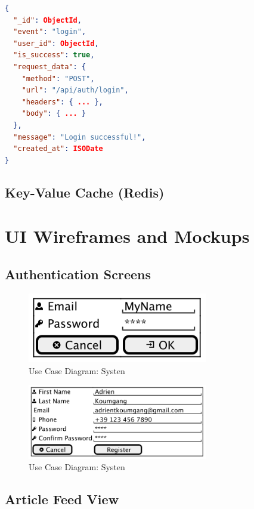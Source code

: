 \begin{lstlisting}[language=json]
{
  "_id": ObjectId,
  "event": "login",
  "user_id": ObjectId,
  "is_success": true,
  "request_data": {
    "method": "POST",
    "url": "/api/auth/login",
    "headers": { ... },
    "body": { ... }
  },
  "message": "Login successful!",
  "created_at": ISODate
}
\end{lstlisting}


\subsection{Key-Value Cache (Redis)}\label{subsec:key-value-cache-redis}



\section{UI Wireframes and Mockups}\label{sec:ui-wireframes-and-mockups}

\subsection{Authentication Screens}\label{subsec:authentication-screens}

\begin{figure}[!h]
    \centering
    \includegraphics[width=0.7\textwidth]{chapters/chapter_03/login-wireframes}
    \caption{Use Case Diagram: Systen}
    \label{fig:login-wireframes}
\end{figure}

\begin{figure}[!h]
    \centering
    \includegraphics[width=0.7\textwidth]{chapters/chapter_03/registration-wireframes}
    \caption{Use Case Diagram: Systen}
    \label{fig:login-wireframes}
\end{figure}


\subsection{Article Feed View}\label{subsec:article-feed-view}


